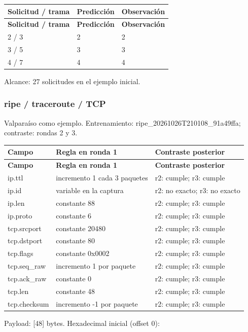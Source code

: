 \begingroup
\fontsize{9}{11}\selectfont
\addtocounter{table}{-1}
\begin{longtable}{p{3.2cm}p{5.1cm}p{5.1cm}}
\toprule
\textbf{Solicitud / trama} & \textbf{Predicción} & \textbf{Observación} \\ \midrule
\endfirsthead
\toprule
\textbf{Solicitud / trama} & \textbf{Predicción} & \textbf{Observación} \\ \midrule
\endhead
2 / 3 & 2 & 2 \\
3 / 5 & 3 & 3 \\
4 / 7 & 4 & 4 \\
\bottomrule
\end{longtable}
\endgroup
Alcance: 27 solicitudes en el ejemplo inicial.

\subsubsection{ripe / traceroute / TCP}
Valparaíso como ejemplo. Entrenamiento: ripe\_\allowbreak{}20261026T210108\_\allowbreak{}91a49ffa; contraste: rondas 2 y 3.

\begingroup
\fontsize{9}{11}\selectfont
\addtocounter{table}{-1}
\begin{longtable}{p{3.1cm}p{5.8cm}p{5.1cm}}
\toprule
\textbf{Campo} & \textbf{Regla en ronda 1} & \textbf{Contraste posterior} \\ \midrule
\endfirsthead
\toprule
\textbf{Campo} & \textbf{Regla en ronda 1} & \textbf{Contraste posterior} \\ \midrule
\endhead
ip.ttl & incremento 1 cada 3 paquetes & r2: cumple; r3: cumple \\
ip.id & variable en la captura & r2: no exacto; r3: no exacto \\
ip.len & constante 88 & r2: cumple; r3: cumple \\
ip.proto & constante 6 & r2: cumple; r3: cumple \\
tcp.srcport & constante 20480 & r2: cumple; r3: cumple \\
tcp.dstport & constante 80 & r2: cumple; r3: cumple \\
tcp.flags & constante 0x0002 & r2: cumple; r3: cumple \\
tcp.seq\_\allowbreak{}raw & incremento 1 por paquete & r2: cumple; r3: cumple \\
tcp.ack\_\allowbreak{}raw & constante 0 & r2: cumple; r3: cumple \\
tcp.len & constante 48 & r2: cumple; r3: cumple \\
tcp.checksum & incremento -1 por paquete & r2: cumple; r3: cumple \\
\bottomrule
\end{longtable}
\endgroup
Payload: [48] bytes. Hexadecimal inicial (offset 0):

